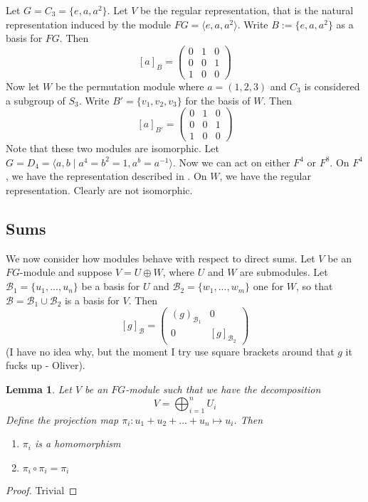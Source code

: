 \documentclass[11pt, notitlepage]{article}
\numberwithin{equation}{section}
\theoremstyle{plain}
\newtheorem{lemma}[theorem]{Lemma}
\theoremstyle{definition}
\newenvironment{example}
	{\pushQED{\qed}\renewcommand{\qedsymbol}{$\blacktriangleleft$}\examplex}
	{\popQED\endexamplex}
\newcommand{\mcl}{\mathcal}
\begin{document}
\begin{example}
	Let $G = C_3 = \{e, a, a^2\}$. Let $V$ be the regular representation, that is the natural representation induced by the module $FG = \langle e, a, a^2 \rangle$. Write $B:= \{e, a, a^2\}$ as a basis for $FG$. Then $$[a]_B = \left(\begin{matrix}
	0 & 1 & 0 \\ 0 & 0 & 1 \\ 1 & 0 & 0
	\end{matrix}\right)$$ Now let $W$ be the permutation module where $a = (1, 2, 3)$ and $C_3$ is considered a subgroup of $S_3$. Write $B' = \{v_1, v_2, v_3\}$ for the basis of $W$. Then $$[a]_{B'} = \left(\begin{matrix}
	0 & 1 & 0 \\ 0 & 0 & 1 \\ 1 & 0 & 0
	\end{matrix}\right)$$
	Note that these two modules are isomorphic. 
\end{example}
\begin{example}
	Let $G = D_4 = \langle a, b \mid a^4 = b^2 = 1, a^b = a^{-1}\rangle$. Now we can act on either $F^4$ or $F^8$. On $F^4$, we have the representation described in . On $W$, we have the regular representation. Clearly are not isomorphic.
\end{example}

\subsection{Sums}

We now consider how modules behave with respect to direct sums. Let $V$ be an $FG$-module and suppose $V = U \oplus W$, where $U$ and $W$ are submodules. Let $\mcl{B}_1 =\{u_1,...,u_n\}$ be a basis for $U$ and $\mcl{B}_2 =\{w_1,...,w_m\}$ one for $W$, so that $\mcl{B} = \mcl{B}_1 \cup \mcl{B_2}$ is a basis for $V$. Then $$[g]_{\mcl{B}} = \begin{pmatrix} (g)_{\mcl{B}_1} & 0 \\0 & [g]_{\mcl{B}_2} \end{pmatrix}$$ (I have no idea why, but the moment I try use square brackets around that $g$ it fucks up - Oliver). 

\begin{lemma}
	Let $V$ be an $FG$-module such that we have the decomposition $$V = \bigoplus_{i = 1}^n U_i$$ Define the projection map $\pi_i: u_1 + u_2 +...+ u_n \mapsto u_i$. Then 
	\begin{enumerate}
		\item[(i)] $\pi_i$ is a homomorphism
		\item[(ii)] $\pi_i \circ \pi_i = \pi_i$
	\end{enumerate}
\end{lemma}
\begin{proof}
	Trivial
\end{proof}
\end{document}

